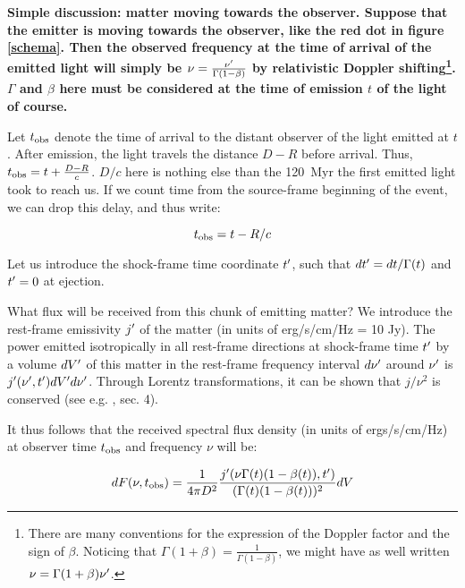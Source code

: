 
\bf{Simple discussion: matter moving towards the observer. }Suppose that the emitter is moving towards the observer, like the red dot in figure \ref{schema}. Then the observed frequency at the time of arrival of the emitted light will simply be $\nu = \frac{\nu^{\prime}}{\Gamma(1 - \beta)}$ by relativistic Doppler shifting\footnote{There are many conventions for the expression of the Doppler factor and the sign of $\beta$. Noticing that $\Gamma(1 + \beta) = \frac{1}{\Gamma(1 - \beta)}$, we might have as well written $\nu = \Gamma (1 + \beta) \nu^{\prime}$.}. $\Gamma$ and $\beta$ here must be considered at the time of emission $t$ of the light of course.

Let ${t_{\mathrm{obs}}}$ denote the time of arrival to the distant observer of the light emitted at $t$. After emission, the light travels the distance $D - R$ before arrival. Thus, ${t_{\mathrm{obs}}} = t + \frac{D - R}{c}$. $D/c$ here is nothing else than the 120~Myr the first emitted light took to reach us. If we count time from the source-frame beginning of the event, we can drop this delay, and thus write:

\begin{equation}\label{tobs}
    {t_{\mathrm{obs}}} = t - R/c
\end{equation}


Let us introduce the shock-frame time coordinate $t^{\prime}$, such that $dt^{\prime} = dt/\Gamma(t)$ and $t^{\prime} = 0$ at ejection.

What flux will be received from this chunk of emitting matter? We introduce the rest-frame emissivity $j^{\prime}$ of the matter (in units of erg/s/cm/Hz = 10 Jy). The power emitted isotropically in all rest-frame directions at shock-frame time $t^{\prime}$ by a volume $dV^{\prime}$ of this matter in the rest-frame frequency interval $d\nu^{\prime}$ around $\nu^{\prime}$ is $j^{\prime}(\nu^{\prime}, t^{\prime})dV^{\prime} d\nu^{\prime}$. Through Lorentz transformations, it can be shown that $j/\nu^2$ is conserved (see e.g. \cite{55}, sec. 4).

It thus follows that the received spectral flux density (in units of ergs/s/cm/Hz) at observer time ${t_{\mathrm{obs}}}$ and frequency $\nu$ will be:

$$dF(\nu, {t_{\mathrm{obs}}}) = \frac{1}{4\pi D^2} \frac{j^{\prime}(\nu \Gamma(t)(1 - \beta(t)), t^{\prime})}{(\Gamma(t)(1 - \beta(t)))^2}dV$$

